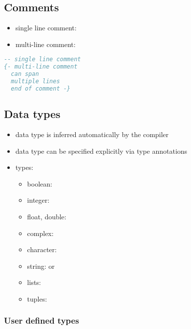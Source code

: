 \documentclass[a4paper,landscape,10pt]{article}
\begin{document}
\begin{multicols*}{2}

  \subsection{Comments}

  \begin{itemize}
    \item single line comment: \ihaskell{--}
    \item multi-line comment: 

  \end{itemize}

  \begin{lstlisting}[language=Haskell]
-- single line comment
{- multi-line comment
  can span
  multiple lines
  end of comment -}
\end{lstlisting}

  \subsection{Data types}

  \begin{itemize}
    \item data type is inferred automatically by the compiler
    \item data type can be specified explicitly via type annotations \ihaskell{::}
    \item types:
          \begin{itemize}
            \item boolean: 
            \item integer: 
            \item float, double: 
            \item complex: 
            \item character: 
            \item string: \ihaskell{["a", "b", "c"]} or 
            \item lists: \ihaskell{[1, 2, 3]}
            \item tuples: 
          \end{itemize}
  \end{itemize}

  \subsubsection{User defined types}


\end{multicols*}
\end{document}
